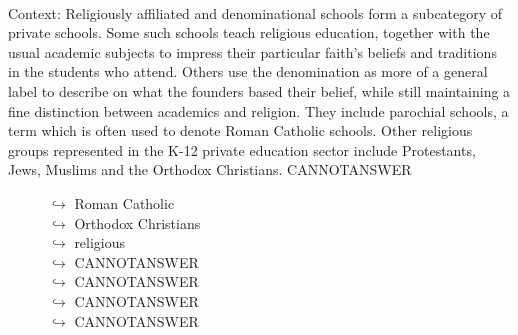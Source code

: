 \documentclass[11pt,a4paper, onecolumn]{article}
\begin{document}
\\ Context: Religiously affiliated and denominational schools form a subcategory of private schools. Some such schools teach religious education, together with the usual academic subjects to impress their particular faith's beliefs and traditions in the students who attend. Others use the denomination as more of a general label to describe on what the founders based their belief, while still maintaining a fine distinction between academics and religion. They include parochial schools, a term which is often used to denote Roman Catholic schools. Other religious groups represented in the K-12 private education sector include Protestants, Jews, Muslims and the Orthodox Christians. CANNOTANSWER

\begin{figure}[t] \small \begin{tcolorbox}[boxsep=0pt,left=5pt,right=0pt,top=2pt,colback = yellow!5] \begin{dialogue}
 \small 
\colorbox{pink!25}{$\hookrightarrow$}
{ Roman Catholic }
\\
\colorbox{pink!25}{$\hookrightarrow$}
{ Orthodox Christians }
\\
\colorbox{pink!25}{$\hookrightarrow$}
{ religious }
\\
\colorbox{pink!25}{$\hookrightarrow$}
{ CANNOTANSWER }
\\
\colorbox{pink!25}{$\hookrightarrow$}
{ CANNOTANSWER }
\\
\colorbox{pink!25}{$\hookrightarrow$}
{ CANNOTANSWER }
\\
\colorbox{pink!25}{$\hookrightarrow$}
{ CANNOTANSWER }
\\
 \end{dialogue}\end{tcolorbox}\end{figure}
\end{document}
